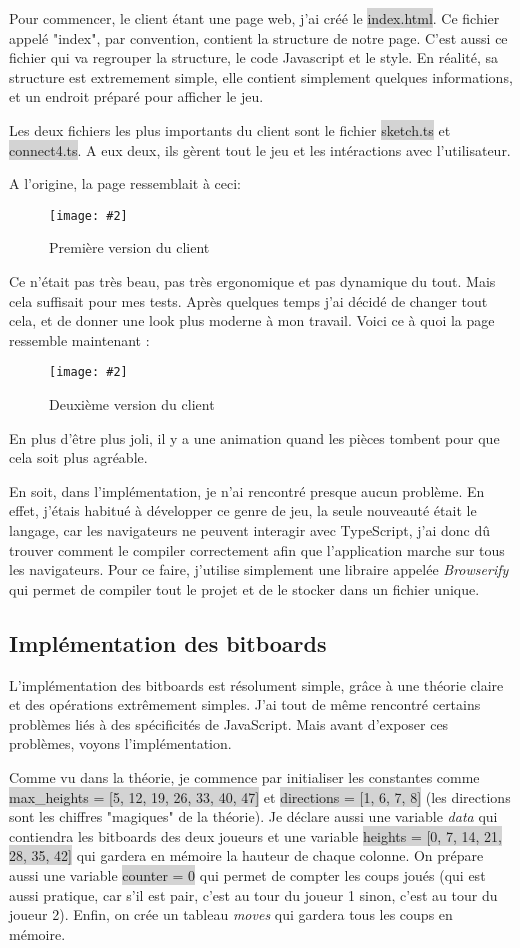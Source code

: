 \documentclass[a4paper]{article}
\newcommand{\img}[3][]{
    \begin{figure}[H]
        \centering
        \texttt{[image: \#2]}
        \caption{#1}    
    \end{figure}
}
\newcommand{\inlinecode}[1]{\colorbox{lightgray}{#1}}
\begin{document}
    Pour commencer, le client étant une page web, j'ai créé le \inlinecode{index.html}. Ce fichier appelé "index", par convention, contient la structure de notre page. C'est aussi ce fichier qui va regrouper la structure, le code Javascript et le style. En réalité, sa structure est extremement simple, elle contient simplement quelques informations, et un endroit préparé pour afficher le jeu.

    Les deux fichiers les plus importants du client sont le fichier \inlinecode{sketch.ts} et \inlinecode{connect4.ts}. A eux deux, ils gèrent tout le jeu et les intéractions avec l'utilisateur.

    A l'origine, la page ressemblait à ceci:
    \img[Première version du client]{Images/FirstClientPreview.png}{0.8}

    Ce n'était pas très beau, pas très ergonomique et pas dynamique du tout. Mais cela suffisait pour mes tests. Après quelques temps j'ai décidé de changer tout cela, et de donner une look plus moderne à mon travail. Voici ce à quoi la page ressemble maintenant :
    \img[Deuxième version du client]{Images/SecondClientPreview.png}{0.8}
    En plus d'être plus joli, il y a une animation quand les pièces tombent pour que cela soit plus agréable.

    En soit, dans l'implémentation, je n'ai rencontré presque aucun problème. En effet, j'étais habitué à développer ce genre de jeu, la seule nouveauté était le langage, car les navigateurs ne peuvent interagir avec TypeScript, j'ai donc dû trouver comment le compiler correctement afin que l'application marche sur tous les navigateurs. Pour ce faire, j'utilise simplement une libraire appelée \textit{Browserify} qui permet de compiler tout le projet et de le stocker dans un fichier unique.

\subsection{Implémentation des bitboards}

	L'implémentation des bitboards est résolument simple, grâce à une théorie claire et des opérations extrêmement simples. J'ai tout de même rencontré certains problèmes liés à des spécificités de JavaScript. Mais avant d'exposer ces problèmes, voyons l'implémentation.

	Comme vu dans la théorie, je commence par initialiser les constantes comme \newline\inlinecode{max\_heights = [5, 12, 19, 26, 33, 40, 47]} et \inlinecode{directions = [1, 6, 7, 8]} (les directions sont les chiffres "magiques" de la théorie). Je déclare aussi une variable \textit{data} qui contiendra les bitboards des deux joueurs et une variable \inlinecode{heights = [0, 7, 14, 21, 28, 35, 42]} qui gardera en mémoire la hauteur de chaque colonne. On prépare aussi une variable \inlinecode{counter = 0} qui permet de compter les coups joués (qui est aussi pratique, car s'il est pair, c'est au tour du joueur 1 sinon, c'est au tour du joueur 2). Enfin, on crée un tableau \textit{moves} qui gardera tous les coups en mémoire.
\end{document}
